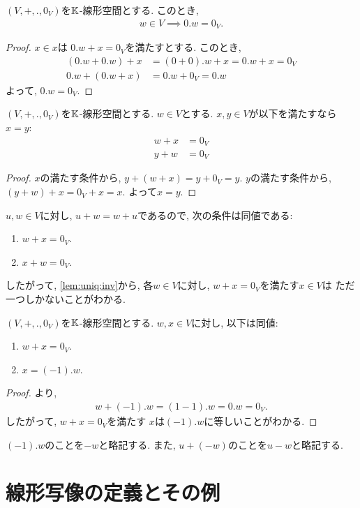 \begin{prop}
  \label{prop:zeroveciszeroscalar}
  $(V,+,.,0_V)$を$\mathbb{K}$-線形空間とする.
  このとき,
  \begin{align*}
    w\in V \implies 0.w=0_V. 
  \end{align*}
\end{prop}
\begin{proof}
  $x\in x$は
  $0.w+x=0_V$を満たすとする.
  このとき,
  \begin{align*}
    (0.w+0.w)+x&=(0+0).w+x=0.w+x=0_V\\
    0.w+(0.w+x)&=0.w+0_V=0.w
  \end{align*}
  よって, $0.w=0_V$.  
\end{proof}

\begin{lemma}
  \label{lem:uniq:inv}
  $(V,+,.,0_V)$を$\mathbb{K}$-線形空間とする.
  $w\in V$とする.
  $x,y\in V$が以下を満たすなら$x=y$:
  \begin{align*}
    w+x&=0_V\\
    y+w&=0_V
  \end{align*}
\end{lemma}
\begin{proof}
  $x$の満たす条件から,
  $y+(w+x)=y+0_V=y$.
  $y$の満たす条件から,
  $(y+w)+x=0_V+x=x$.
  よって$x=y$.
\end{proof}
\begin{remark}
  $u,w\in V$に対し, $u+w=w+u$であるので,
  次の条件は同値である:
  \begin{enumerate}
  \item $w+x=0_V$.
  \item $x+w=0_V$.
  \end{enumerate}
  したがって, \cref{lem:uniq:inv}から,
  各$w\in V$に対し, $w+x=0_V$を満たす$x\in V$は
  ただ一つしかないことがわかる.
\end{remark}
\begin{prop}
  $(V,+,.,0_V)$を$\mathbb{K}$-線形空間とする.
  $w,x\in V$に対し,
  以下は同値:
  \begin{enumerate}
  \item
    \label{prop:inverse:-1:item:1}
    $w+x=0_V$.
  \item
    \label{prop:inverse:-1:item:2}
    $x=(-1).w$.    
  \end{enumerate}
\end{prop}
\begin{proof}
  より,
  \begin{align}
    w+(-1).w=(1-1).w=0.w=0_V.
  \end{align}
  したがって,
  $w+x=0_V$を満たす
  $x$は$(-1).w$に等しいことがわかる.
\end{proof}

\begin{remark}
  $(-1).w$のことを$-w$と略記する.
  また, $u+(-w)$のことを$u-w$と略記する.
\end{remark}




\section{線形写像の定義とその例}

\begin{quiz}
\end{quiz}


